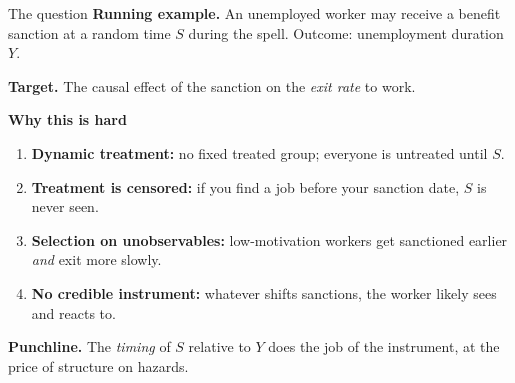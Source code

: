\documentclass[aspectratio=169,10pt]{beamer}
\newcommand{\1}{\mathbf{1}}
\begin{document}
\begin{frame}{The question}
  \textbf{Running example.} An unemployed worker may receive a benefit sanction at a random time $S$ during the spell. Outcome: unemployment duration $Y$.

  \medskip
  \textbf{Target.} The causal effect of the sanction on the \emph{exit rate} to work.

  \medskip
  \textbf{Why this is hard}
  \begin{enumerate}
    \item \textbf{Dynamic treatment:} no fixed treated group; everyone is untreated until $S$.
    \item \textbf{Treatment is censored:} if you find a job before your sanction date, $S$ is never seen.
    \item \textbf{Selection on unobservables:} low-motivation workers get sanctioned earlier \emph{and} exit more slowly.
    \item \textbf{No credible instrument:} whatever shifts sanctions, the worker likely sees and reacts to.
  \end{enumerate}

  \medskip
  \textbf{Punchline.} The \emph{timing} of $S$ relative to $Y$ does the job of the instrument, at the price of structure on hazards.
\end{frame}
\end{document}
